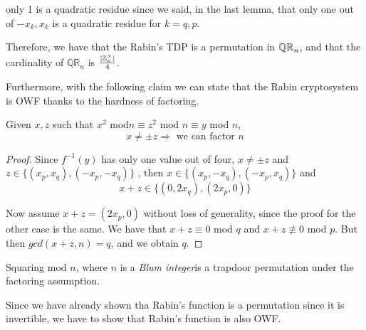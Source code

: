 only 1 is a quadratic residue since we said, in the last lemma, that only one out of $-x_{k}, x_{k}$ is a quadratic residue for $k=q,p$.

Therefore, we have that the Rabin's TDP is a permutation in $\QR[n]$, and that the cardinality of $ \mathbb{QR}_{n} $ is $\frac{|\integer_n^\times|}{4}$.

Furthermore, with the following claim we can state that the Rabin cryptosystem
is OWF thanks to the hardness of factoring.

\begin{claim}
    Given $x, z$ such that $x^{2}\text{ mod} n \equiv z^{2} \text{ mod } n
    \equiv y$ mod $n$,
    \[
        x \neq \pm z \Rightarrow \text{ we can factor } n
    \]
\end{claim}

\begin{proof}
    Since $f^{-1}(y)$ has only one value out of four, $x\neq \pm z$ and $z\in \{(x_{p},x_{q}),(-x_{p},-x_{q})\}$ , then $x \in \{(x_{p},-x_{q}),(-x_{p},x_{q})\}$ and 
    \[
        x + z \in \{(0,2x_{q}), (2x_{p}, 0)\}
    \]

    Now assume $x + z = (2x_{p}, 0)$ without loss of generality, since the proof for the other case is the same. We have that $x+z \equiv 0$ mod $q$ and $x+z \not\equiv 0 $ mod $p$. But then $gcd( x+z , n)=q$, and we obtain $q$.
\end{proof}

\begin{theorem}
    Squaring mod $n$, where $n$ is a \emph{Blum integer}\footnotemark is a trapdoor permutation under the factoring assumption.
\end{theorem}


Since we have already shown tha Rabin's function is a permutation since it is invertible, we have to show that Rabin's function is also OWF.

